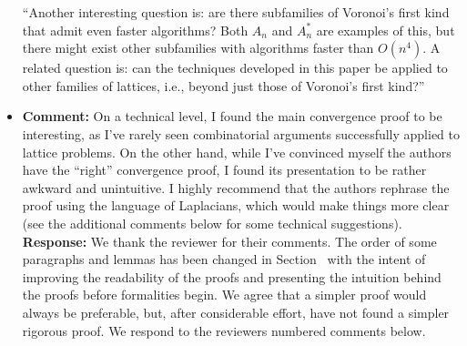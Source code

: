 \documentclass[a4paper,10pt]{article}
\begin{document}
\begin{itemize}
``Another interesting question is: are there subfamilies of Voronoi's first kind that admit even faster algorithms?  Both $A_n$ and $A_n^*$ are examples of this, but there might exist other subfamilies with algorithms faster than $O(n^4)$.  A related question is: can the techniques developed in this paper be applied to other families of lattices, i.e., beyond just those of Voronoi's first kind?''


\item\textbf{Comment:} 
On a technical level, I found the main convergence proof to be interesting, as I've rarely seen
combinatorial arguments successfully applied to lattice problems. On the other hand, while I've
convinced myself the authors have the ``right'' convergence proof, I found its presentation to be
rather awkward and unintuitive. I highly recommend that the authors rephrase the proof using
the language of Laplacians, which would make things more clear (see the additional comments
below for some technical suggestions).
\\\textbf{Response:}
We thank the reviewer for their comments.  The order of some paragraphs and lemmas has been changed in Section~ with the intent of improving the readability of the proofs and presenting the intuition behind the proofs before formalities begin.  We agree that a simpler proof would always be preferable, but, after considerable effort, have not found a simpler rigorous proof.  We respond to the reviewers numbered comments below.

\end{itemize}
\end{document}
